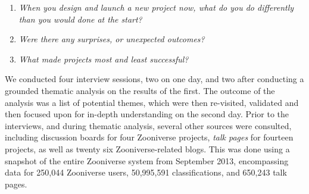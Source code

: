 \documentclass{sigchi}
\begin{document}
\begin{enumerate}[itemsep=1mm]
\item \emph{When you design and launch a new project now, what do you do differently than you would done at the start?}
\item \emph{Were there any surprises, or unexpected outcomes?}
\item \emph{What made projects most and least successful?}
\end{enumerate}

We conducted four interview sessions, two on one day, and two after conducting a grounded thematic analysis on the results of the first\cite{mazzolini2003sage}.  The outcome of the analysis was a list of potential themes, which were then re-visited, validated and then focused upon for in-depth understanding on the second day.  Prior to the interviews, and during thematic analysis, several other sources were consulted, including discussion boards for four Zooniverse projects, \emph{talk pages} for fourteen projects, as well as twenty six Zooniverse-related blogs.  This was done using  a snapshot of the entire Zooniverse system from September 2013, encompassing data for 250,044 Zooniverse users, 50,995,591 classifications, and 650,243 talk pages.



\end{document}

